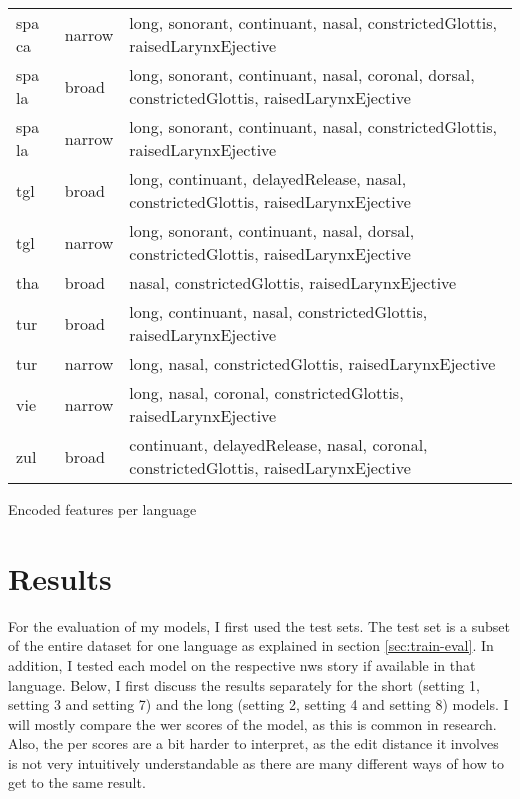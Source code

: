 {\begin{tabularx}{1.3\textwidth}{|llX|}
spa ca             & narrow        & long, sonorant, continuant, nasal, constrictedGlottis, raisedLarynxEjective                                                        \\
spa la             & broad         & long, sonorant, continuant, nasal, coronal, dorsal, constrictedGlottis, raisedLarynxEjective                                       \\
spa la             & narrow        & long, sonorant, continuant, nasal, constrictedGlottis, raisedLarynxEjective                                                        \\
tgl                & broad         & long, continuant, delayedRelease, nasal, constrictedGlottis, raisedLarynxEjective                                                  \\
tgl                & narrow        & long, sonorant, continuant, nasal, dorsal, constrictedGlottis, raisedLarynxEjective                                                \\
tha                & broad         & nasal, constrictedGlottis, raisedLarynxEjective                                                                                    \\
tur                & broad         & long, continuant, nasal, constrictedGlottis, raisedLarynxEjective                                                                  \\
tur                & narrow        & long, nasal, constrictedGlottis, raisedLarynxEjective                                                                              \\
vie                & narrow        & long, nasal, coronal, constrictedGlottis, raisedLarynxEjective                                                                     \\
zul                & broad         & continuant, delayedRelease, nasal, coronal, constrictedGlottis, raisedLarynxEjective  \\
\hline                                            
\end{tabularx}
\vspace{-0.2cm}
}{Encoded features per language}


\section{Results}

For the evaluation of my models, I first used the test sets. The test set is a subset of the entire dataset for one language as explained in section \ref{sec:train-eval}. In addition, I tested each model on the respective \ac{nws} story if available in that language. Below, I first discuss the results separately for the short (setting 1, setting 3 and setting 7) and the long (setting 2, setting 4 and setting 8) models. I will mostly compare the \ac{wer} scores of the model, as this is common in research. Also, the \ac{per} scores are a bit harder to interpret, as the edit distance it involves is not very intuitively understandable as there are many different ways of how to get to the same result. 

